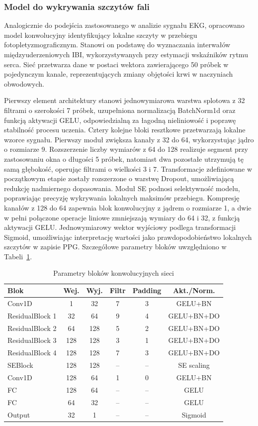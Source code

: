 \documentclass[journal]{IEEEtran}
\begin{document}
{\subsubsection{Model do wykrywania szczytów fali}
Analogicznie do podejścia zastosowanego w analizie sygnału EKG, opracowano model konwolucyjny identyfikujący lokalne szczyty w przebiegu fotopletyzmograficznym. Stanowi on podstawę do wyznaczania interwałów międzyuderzeniowych IBI, wykorzystywanych przy estymacji wskaźników rytmu serca. Sieć przetwarza dane w postaci wektora zawierającego 50 próbek w pojedynczym kanale, reprezentujących zmiany objętości krwi w naczyniach obwodowych.

Pierwszy element architektury stanowi jednowymiarowa warstwa splotowa z 32 filtrami o szerokości 7 próbek, uzupełniona normalizacją BatchNorm1d oraz funkcją aktywacji GELU, odpowiedzialną za łagodną nieliniowość i poprawę stabilność procesu uczenia. Cztery kolejne bloki resztkowe przetwarzają lokalne wzorce sygnału. Pierwszy moduł zwiększa kanały z 32 do 64, wykorzystując jądro o rozmiarze 9.  Rozszerzenie liczby wymiarów z 64 do 128 realizuje segment przy zastosowaniu okna o długości 5 próbek, natomiast dwa pozostałe utrzymują tę samą głębokość, operując filtrami o wielkości 3 i 7. Transformacje zdefiniowane w początkowym etapie zostały rozszerzone o warstwę Dropout, umożliwiającą redukcję nadmiernego dopasowania. 
\newpage
Moduł SE podnosi selektywność modelu, poprawiając precyzję wykrywania lokalnych maksimów przebiegu. Kompresję kanałów z 128 do 64 zapewnia blok konwolucyjny z jądrem o rozmiarze 1, a dwie w pełni połączone operacje liniowe zmniejszają wymiary do 64 i 32, z funkcją aktywacji GELU. Jednowymiarowy wektor wyjściowy podlega transformacji Sigmoid, umożliwiając interpretację wartości jako prawdopodobieństwo lokalnych szczytów w zapisie PPG. Szczegółowe parametry bloków uwzględniono w Tabeli~\ref{tab:ppg_layers}.

\begin{table}[ht]
\centering
\caption{Parametry bloków konwolucyjnych sieci}
\label{tab:ppg_layers}
\begin{tabular}{|l|c|c|c|c|c|}
\hline
\textbf{Blok} & \textbf{Wej.} & \textbf{Wyj.} & \textbf{Filtr} & \textbf{Padding} & \textbf{Akt./Norm.} \\
\hline
Conv1D & 1 & 32 & 7 & 3 & GELU+BN \\
ResidualBlock 1 & 32 & 64 & 9 & 4 & GELU+BN+DO \\
ResidualBlock 2 & 64 & 128 & 5 & 2 & GELU+BN+DO \\
ResidualBlock 3 & 128 & 128 & 3 & 1 & GELU+BN+DO\\
ResidualBlock 4 & 128 & 128 & 7 & 3 & GELU+BN+DO \\
SEBlock & 128 & 128 & – & – & SE scaling \\
Conv1D  & 128 & 64 & 1 & 0 & GELU+BN \\
FC & 128 & 64 & – & – & GELU \\
FC & 64 & 32 & – & – & GELU \\
Output & 32 & 1 & – & – & Sigmoid \\
\hline
\end{tabular}
\end{table}

}
\end{document}
